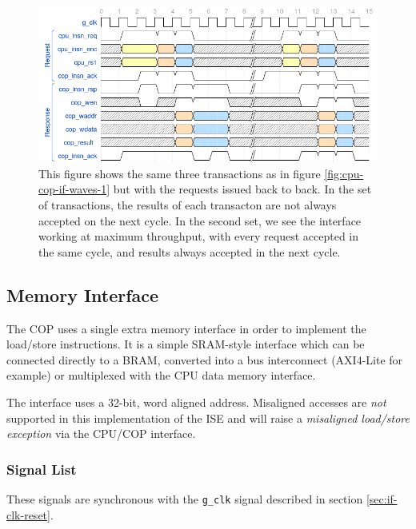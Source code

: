 \documentclass{article}
\begin{document}
\begin{figure}[H]
\centering
\includegraphics[width=\textwidth]{./diagrams/cpu-cop-if-2.png}
\caption{This figure shows the same three transactions as in figure
\ref{fig:cpu-cop-if-waves-1} but with the requests issued back to back.
In the set of transactions, the results of each transacton are not always
accepted on the next cycle. In the second set, we see the interface working
at maximum throughput, with every request accepted in the same cycle, and
results always accepted in the next cycle.}
\end{figure}



\subsection{Memory Interface}
\label{sec:mem-if}

The COP uses a single extra memory interface in order to implement the
load/store instructions. It is a simple SRAM-style interface which can be
connected directly to a BRAM, converted into a bus interconnect (AXI4-Lite
for example) or multiplexed with the CPU data memory interface.

The interface uses a 32-bit, word aligned address. Misaligned accesses
are {\em not} supported in this implementation of the ISE and will raise
a {\em misaligned load/store exception} via the CPU/COP interface.

\subsubsection{Signal List}

These signals are synchronous with the {\tt g\_clk} signal described in
section \ref{sec:if-clk-reset}.
\end{document}
